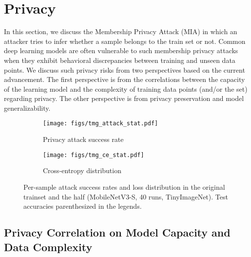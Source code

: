 \section{Privacy}\label{sec:privacy}
In this section, we discuss the Membership Privacy Attack (MIA) in which an attacker tries to infer whether a sample belongs to the train set or not.
Common deep learning models are often vulnerable to such membership privacy attacks when they exhibit behavioral discrepancies between training and unseen data points. %
We discuss such privacy risks from two perspectives based on the current advancement. The first perspective is from the correlations between the capacity of the learning model and the complexity of training data points (and/or the set) regarding privacy. The other perspective is from privacy preservation and model generalizability.


\begin{figure}[t]
     \centering
     \begin{subfigure}[b]{0.21\textwidth}
         \centering
         \texttt{[image: figs/tmg\_attack\_stat.pdf]}
         \caption{Privacy attack success rate}
         \label{fig:cmp_half_full_tmg}
     \end{subfigure}
     \hspace{0.1in}
     \begin{subfigure}[b]{0.21\textwidth}
         \centering
         \texttt{[image: figs/tmg\_ce\_stat.pdf]}
         \caption{Cross-entropy distribution}
         \label{fig:cmp_half_full_tmg_ce}
     \end{subfigure}
      \caption{Per-sample attack success rates and loss distribution in the original trainset and the half (MobileNetV3-S, 40 runs, TinyImageNet). Test accuracies parenthesized in the legends.}
      \vspace{-0.1cm}
  \label{fig:cmp_data_tmg}
\end{figure}



\subsection{Privacy Correlation on Model Capacity and Data Complexity}

